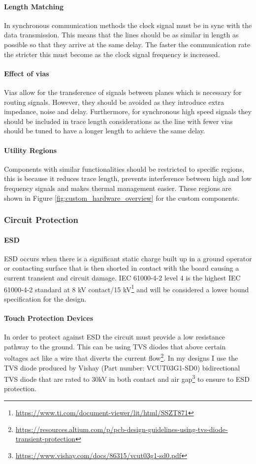 \paragraph{Length Matching}
In synchronous communication methods the clock signal must be in sync with the data transmission. This means that the lines should be as similar in length as possible so that they arrive at the same delay. The faster the communication rate the stricter this must become as the clock signal frequency is increased.
\paragraph{Effect of vias}
Vias allow for the transference of signals between planes which is necessary for routing signals. However, they should be avoided as they introduce extra impedance, noise and delay. Furthermore, for synchronous high speed signals they should be included in trace length considerations as the line with fewer vias should be tuned to have a longer length to achieve the same delay.
\paragraph{Utility Regions}
Components with similar functionalities should be restricted to specific regions, this is because it reduces trace length, prevents interference between high and low frequency signals and makes thermal management easier. These regions are shown in Figure \ref{fig:custom_hardware_overview} for the custom components.

\subsubsection{Circuit Protection}\label{sub_sub_section:tgt_circuit_protection}
\paragraph{\gls{ESD}}
\gls{ESD} occurs when there is a significant static charge built up in a ground operator or contacting surface that is then shorted in contact with the board causing a current transient and circuit damage. IEC 61000-4-2 level 4 is the highest IEC 61000-4-2 standard at 8 kV contact/15 kV\footnote{\url{https://www.ti.com/document-viewer/lit/html/SSZT871}} and will be considered a lower bound specification for the design. 
\paragraph{Touch Protection Devices}
In order to protect against \gls{ESD} the circuit must provide a low resistance pathway to the ground. This can be using \gls{TVS} diodes that above certain voltages act like a wire that diverts the current flow\footnote{\url{https://resources.altium.com/p/pcb-design-guidelines-using-tvs-diode-transient-protection}}. In my designs I use the \gls{TVS} diode produced by Vishay (Part number: VCUT03G1-SD0) bidirectional \gls{TVS} diode that are rated to 30kV in both contact and air gap\footnote{\url{https://www.vishay.com/docs/86315/vcut03g1-sd0.pdf}} to ensure to \gls{ESD} protection. 
